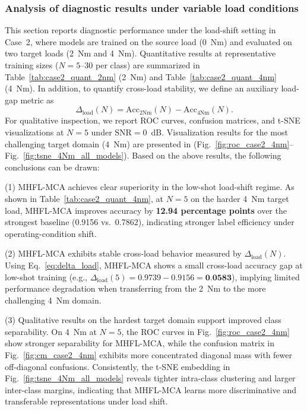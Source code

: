 \documentclass[a4paper]{cas-sc}
\begin{document}
\subsubsection{Analysis of diagnostic results under variable load conditions} 
\label{sec:case2_variable_load_results}
This section reports diagnostic performance under the load-shift setting in Case~2, where models are trained on the source load (0~Nm) and evaluated on two target loads (2~Nm and 4~Nm). Quantitative results at representative training sizes ($N=5$--$30$ per class) are summarized in Table~\ref{tab:case2_quant_2nm} (2~Nm) and Table~\ref{tab:case2_quant_4nm} (4~Nm). In addition, to quantify cross-load stability, we define an auxiliary load-gap metric as
\begin{equation}
\Delta_{\mathrm{load}}(N)=\mathrm{Acc}_{2\mathrm{Nm}}(N)-\mathrm{Acc}_{4\mathrm{Nm}}(N).
\label{eq:delta_load}
\end{equation}
For qualitative inspection, we report ROC curves, confusion matrices, and t-SNE visualizations at $N=5$ under $\mathrm{SNR}=0$~dB. Visualization results for the most challenging target domain (4~Nm) are presented in (Fig.~\ref{fig:roc_case2_4nm}--Fig.~\ref{fig:tsne_4Nm_all_models}). Based on the above results, the following conclusions can be drawn:

(1) MHFL-MCA achieves clear superiority in the low-shot load-shift regime. As shown in Table~\ref{tab:case2_quant_4nm}, at $N=5$ on the harder 4~Nm target load, MHFL-MCA improves accuracy by \textbf{12.94 percentage points} over the strongest baseline (0.9156 vs.\ 0.7862), indicating stronger label efficiency under operating-condition shift.

(2) MHFL-MCA exhibits stable cross-load behavior measured by $\Delta_{\mathrm{load}}(N)$. Using Eq.~\eqref{eq:delta_load}, MHFL-MCA shows a small cross-load accuracy gap at low-shot training (e.g., $\Delta_{\mathrm{load}}(5)=0.9739-0.9156=\textbf{0.0583}$), implying limited performance degradation when transferring from the 2~Nm to the more challenging 4~Nm domain.

(3) Qualitative results on the hardest target domain support improved class separability. On 4~Nm at $N=5$, the ROC curves in Fig.~\ref{fig:roc_case2_4nm} show stronger separability for MHFL-MCA, while the confusion matrix in Fig.~\ref{fig:cm_case2_4nm} exhibits more concentrated diagonal mass with fewer off-diagonal confusions. Consistently, the t-SNE embedding in Fig.~\ref{fig:tsne_4Nm_all_models} reveals tighter intra-class clustering and larger inter-class margins, indicating that MHFL-MCA learns more discriminative and transferable representations under load shift.
\end{document}
